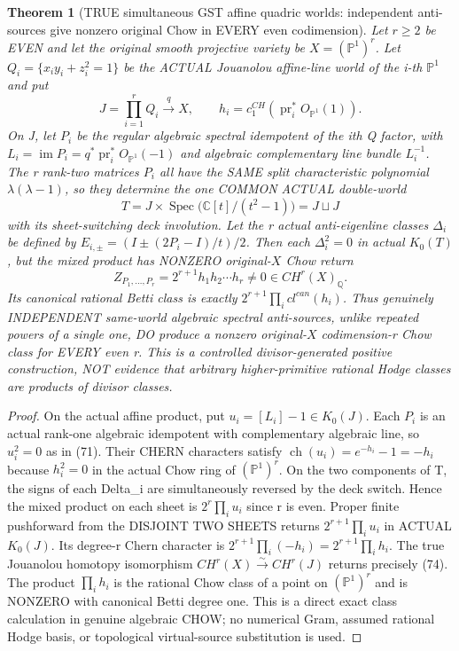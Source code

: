 \documentclass[11pt]{article}
\newtheorem{theorem}{Theorem}[section]
\begin{document}
\begin{theorem}[TRUE simultaneous GST affine quadric worlds:
independent anti-sources give nonzero original Chow in EVERY even codimension]
Let $r\ge2$ be EVEN and
let the original smooth
projective variety be
$X=(\mathbb P^1)^r$.
Let $Q_i=\{x_iy_i+z_i^2=1\}$
be the ACTUAL Jouanolou
affine-line world of the i-th
$\mathbb P^1$ and put
\[
 J=\prod_{i=1}^{r}Q_i
    \xrightarrow{q}
    X,\qquad
 h_i=c_1^{CH}
   (\operatorname{pr}_i^*
     O_{\mathbb P^1}(1)).
\]
On J, let $P_i$ be the
regular algebraic spectral
idempotent of the ith Q
factor, with
$L_i=\operatorname{im}P_i
 =q^*\operatorname{pr}_i^*
      O_{\mathbb P^1}(-1)$
and algebraic complementary
line bundle $L_i^{-1}$.
The r rank-two matrices
$P_i$ all have the SAME
split characteristic
polynomial
$\lambda(\lambda-1)$,
so they determine the
one COMMON ACTUAL double-world
\[
 T=J\times\operatorname{Spec}
       \bigl(\mathbb C[t]/(t^2-1)\bigr)
   =J\sqcup J
\]
with its sheet-switching
deck involution.
Let the r actual
anti-eigenline classes
$\Delta_i$ be defined by
$E_{i,\pm}=(I\pm(2P_i-I)/t)/2$.
Then each
$\Delta_i^2=0$ in actual
$K_0(T)$, but the mixed
product has NONZERO
original-$X$ Chow return
\[
 \boxed{
 Z_{P_1,\ldots,P_r}
   =2^{r+1}
        h_1h_2\cdots h_r
   \ne0\in CH^r(X)_{\mathbb Q}.
 }                                             \tag{74}
\]
Its canonical rational
Betti class is exactly
$2^{r+1}\prod_i cl^{can}(h_i)$.
Thus genuinely INDEPENDENT
same-world algebraic spectral
anti-sources, unlike repeated
powers of a single one,
DO produce a nonzero
original-$X$ codimension-r
Chow class for EVERY even r.
This is a controlled
divisor-generated positive
construction, NOT evidence
that arbitrary higher-primitive
rational Hodge classes are
products of divisor classes.
\end{theorem}
\begin{proof}
On the actual affine product,
put $u_i=[L_i]-1\in K_0(J)$.
Each $P_i$ is an actual rank-one
algebraic idempotent with
complementary algebraic line,
so $u_i^2=0$ as in (71).
Their CHERN characters
satisfy
$\operatorname{ch}(u_i)=
  e^{-h_i}-1=-h_i$
because $h_i^2=0$ in
the actual Chow ring
of $(\mathbb P^1)^r$.
On the two components of T,
the signs of each Delta_i
are simultaneously reversed
by the deck switch.
Hence the mixed product on
each sheet is
$2^r\prod_i u_i$ since r is
even. Proper finite pushforward
from the DISJOINT TWO SHEETS
returns
$2^{r+1}\prod_i u_i$
in ACTUAL $K_0(J)$.
Its degree-r Chern character is
$2^{r+1}\prod_i(-h_i)
=2^{r+1}\prod_i h_i$.
The true Jouanolou
homotopy isomorphism
$CH^r(X)\overset\sim\to CH^r(J)$
returns precisely (74).
The product $\prod_i h_i$
is the rational Chow class
of a point on
$(\mathbb P^1)^r$ and is
NONZERO with canonical
Betti degree one.
This is a direct exact
class calculation in genuine
algebraic CHOW; no numerical
Gram, assumed rational
Hodge basis, or topological
virtual-source substitution
is used.
\end{proof}
\end{document}
